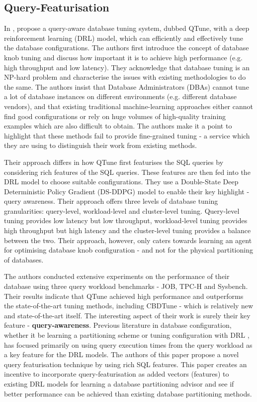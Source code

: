 \subsection{Query-Featurisation}
In \cite{DBLP:journals/pvldb/LiZLG19}, \citeauthor{DBLP:journals/pvldb/LiZLG19} propose a query-aware database tuning system, dubbed QTune, with a deep reinforcement learning (DRL) model, which can efficiently and effectively tune the database configurations. The authors first introduce the concept of database knob tuning and discuss how important it is to achieve high performance (e.g. high throughput and low latency). They acknowledge that database tuning is an NP-hard problem and characterise the issues with existing methodologies to do the same. The authors insist that Database Administrators (DBAs) cannot tune a lot of database instances on different environments (e.g. different database vendors), and that existing traditional machine-learning approaches either cannot find good configurations or rely on huge volumes of high-quality training examples which are also difficult to obtain. The authors make it a point to highlight that these methods fail to provide fine-grained tuning - a service which they are using to distinguish their work from existing methods.

Their approach differs in how QTune first featurises the SQL queries by considering rich features of the SQL queries. These features are then fed into the DRL model to choose suitable configurations. They use a Double-State Deep Deterministic Policy Gradient (DS-DDPG) model to enable their key highlight - query awareness. Their approach offers three levels of database tuning granularities: query-level, workload-level and cluster-level tuning. Query-level tuning provides low latency but low throughput, workload-level tuning provides high throughput but high latency and the cluster-level tuning provides a balance between the two. Their approach, however, only caters towards learning an agent for optimising database knob configuration - and not for the physical partitioning of databases.

The authors conducted extensive experiments on the performance of their database using three query workload benchmarks - JOB, TPC-H and Sysbench. Their results indicate that QTune achieved high performance and outperforms the state-of-the-art tuning methods, including CBDTune - which is relatively new and state-of-the-art itself. The interesting aspect of their work is surely their key feature - \textbf{query-awareness}.  Previous literature in database configuration, whether it be learning a partitioning scheme or tuning configuration with DRL \cite{Hilprecht:2019:TLP:3329859.3329876,DBLP:conf/sigmod/HilprechtBR20,DBLP:conf/sigmod/ZhangLZLXCXWCLR19}, has focused primarily on using query execution times from the query workload as a key feature for the DRL models. The authors of this paper propose a novel query featurisation technique by using rich SQL features. This paper creates an incentive to incorporate query-featurisation as added vectors (features) to existing DRL models for learning a database partitioning advisor and see if better performance can be achieved than existing database partitioning methods. 
